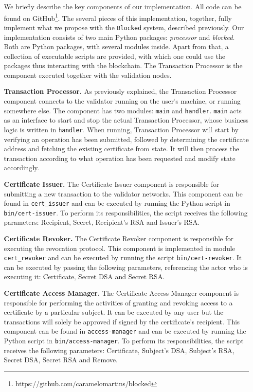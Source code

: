 We briefly describe the key components of our implementation. All code can be found on GitHub\footnote{https://github.com/caramelomartins/blocked}. The several pieces of this implementation, together, fully implement what we propose with the  \texttt{Blocked} system, described previously. Our implementation consists of two main Python packages: \textit{processor} and \textit{blocked}. Both are Python packages, with several modules inside. Apart from that, a collection of executable scripts are provided, with which one could use the packages thus interacting with the blockchain. The Transaction Processor is the component executed together with the validation nodes.

\textbf{Transaction Processor.} As previously explained, the Transaction Processor component connects to the validator running on the user's machine, or running somewhere else. The component has two modules: \texttt{main} and \texttt{handler}. \texttt{main} acts as an interface to start and stop the actual Transaction Processor, whose business logic is written in \texttt{handler}. When running, Transaction Processor will start by verifying an operation has been submitted, followed by determining the certificate address and fetching the existing certificate from state. It will then process the transaction according to what operation has been requested and modify state accordingly.

\textbf{Certificate Issuer.} The Certificate Issuer component is responsible for submitting a new transaction to the validator networks. This component can be found in \texttt{cert\_issuer} and can be executed by running the Python script in \texttt{bin/cert-issuer}. To perform its responsibilities, the script receives the following parameters: Recipient, Secret, Recipient's RSA and Issuer's RSA.

\textbf{Certificate Revoker.} The Certificate Revoker component is responsible for executing the revocation protocol. This component is implemented in module \texttt{cert\_revoker} and can be executed by running the script \texttt{bin/cert-revoker}. It can be executed by passing the following parameters, referencing the actor who is executing it: Certificate, Secret DSA and Secret RSA.

\textbf{Certificate Access Manager.} The Certificate Access Manager component is responsible for performing the activities of granting and revoking access to a certificate by a particular subject. It can be executed by any user but the transactions will solely be approved if signed by the certificate's recipient. This component can be found in \texttt{access-manager} and can be executed by running the Python script in \texttt{bin/access-manager}. To perform its responsibilities, the script receives the following parameters: Certificate, Subject's DSA, Subject's RSA, Secret DSA, Secret RSA and Remove.


